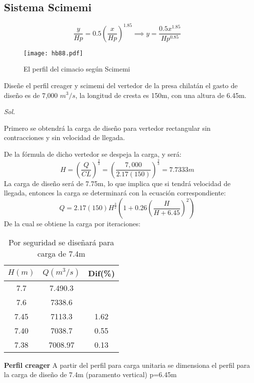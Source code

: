 \subsection{Sistema Scimemi}

\begin{equation}
    \frac{y}{Hp} = 0.5\left(\frac{x}{Hp}\right)^{1.85}\implies y = \frac{0.5x^{1.85}}{Hp^{0.85}}
\end{equation}
\begin{figure}[h!]
\centering
  \texttt{[image: hb88.pdf]}
  \caption{El perfil del cimacio según Scimemi}
  \label{hb88}
\end{figure}

\begin{example}
    Diseñe el perfil creager y scimemi del vertedor de la presa chilatán el gasto de diseño es de 7,000 $m^3/s$, la longitud de cresta es 150m, con una altura de 6.45m.
\end{example}

\textit{ Sol. }

Primero se obtendrá la carga de diseño para vertedor rectangular sin contracciones y sin velocidad de llegada.

De la fórmula de dicho vertedor se despeja la carga, y será:
\begin{equation*}
    H =\left(\frac{Q}{CL}\right)^{\frac{2}{3}} =\left(\frac{7,000}{2.17(150)}\right)^{\frac{2}{3}} =7.7333m
\end{equation*}
La carga de diseño será de 7.75m, lo que implica que si tendrá velocidad de llegada, entonces la carga se determinará con la ecuación correspondiente:
\begin{equation*}
    Q =2.17(150)H^{\frac{3}{2}} \left(1 +0.26\left(\frac{H}{H + 6.45}\right)^2 \right)
\end{equation*}
De la cual se obtiene la carga por iteraciones:
\begin{table}[h!]
    \centering\begin{tabular}{@{}ccc@{}}
    \toprule
    $H(m)$ & $Q(m^3/s)$ & Dif(\%) \\ \midrule
    7.7    & 7.490.3    &         \\
    7.6    & 7338.6     &         \\
    7.45   & 7113.3     & 1.62    \\
    7.40   & 7038.7     & 0.55    \\
    7.38   & 7008.97    & 0.13    \\ \bottomrule
    \end{tabular}
    \caption{Por seguridad se diseñará para carga de 7.4m}
    \label{tabhb10}
    \end{table}
\textbf{Perfil creager}
A partir del perfil para carga unitaria se dimensiona el perfil para la carga de diseño de 7.4m (paramento vertical) p=6.45m


